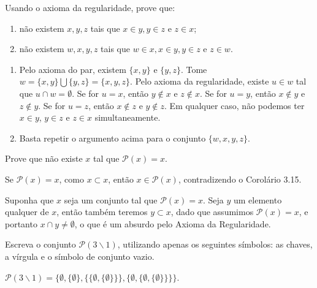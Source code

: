 \begin{exercicio}
	Usando o axioma da regularidade, prove que:
	\begin{enumerate}[label=(\alph{*})]
		\item não existem $x,y,z$ tais que $x\in y,y\in z$ e $z\in x$;
		\item não existem $w,x,y,z$ tais que $w\in x,x\in y,y\in z$ e $z\in w$.
	\end{enumerate}
\end{exercicio}
\begin{solucao}
	\begin{enumerate}[label=(\alph{*})]
		\item Pelo axioma do par, existem $\{x,y\}$ e $\{y,z\}$. Tome $w=\{x,y\}\bigcup \{y,z\}=\{x,y,z\}$. Pelo axioma da regularidade, existe $u\in w$ tal que $u\cap w=\emptyset$. Se for $u=x$, então $y\notin x$ e $z\notin x$. Se for $u=y$, então $x\notin y$ e $z\notin y$. Se for $u=z$, então $x\notin z$ e $y\notin z$. Em qualquer caso, não podemos ter $x\in y$, $y\in z$ e $z\in x$ simultaneamente.
		\item Basta repetir o argumento acima para o conjunto $\{w,x,y,z\}$.
	\end{enumerate}
\end{solucao}

\begin{exercicio}
	Prove que não existe $x$ tal que $\mathcal{P}(x)=x$.
\end{exercicio}
\begin{solucao}[ 1]
	Se $\mathcal{P}(x)=x$, como $x\subset x$, então $x\in \mathcal{P}(x)$, contradizendo o Corolário 3.15.
\end{solucao}

\begin{solucao}[ 2]
	Suponha que $x$ seja um conjunto tal que $\mathcal{P}(x)=x$. Seja $y$ um elemento qualquer de $x$, então também teremos $y \subset x$, dado que assumimos $\mathcal{P}(x)=x$, e portanto $x \cap y \neq \emptyset$, o que é um absurdo pelo Axioma da Regularidade.
\end{solucao}

\begin{exercicio}
	Escreva o conjunto $\mathcal{P}(3\backslash 1)$, utilizando apenas os seguintes sí­mbolos: as chaves, a ví­rgula e o sí­mbolo de conjunto vazio.
\end{exercicio}
\begin{solucao}
	$\mathcal{P}(3\backslash 1)=\{\emptyset,\{\emptyset\},\{\{\emptyset,\{\emptyset\}\}\},\{\emptyset,\{\emptyset,\{\emptyset\}\}\}\}$.
\end{solucao}

